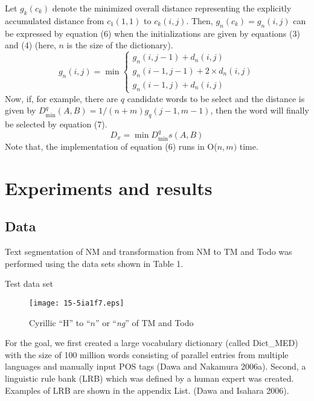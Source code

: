 \documentclass[english]{jnlp_1.4}
\begin{document}
Let $g_{k}(c_{k})$ denote the minimized overall distance representing the explicitly 
accumulated distance from $c_{1}(1,1)$ to $c_{k}(i,j)$. 
Then, $g_{n}(c_{k})=g_{n}(i,j)$ can be expressed by equation (6) when the initializations are given by 
equations (3) and (4) (here, $n$ is the size of the dictionary).
\begin{equation}
 g_{n}(i,j)= \min
  \begin{cases}
	g_{n}(i,j-1)+d_{n}(i,j) \\
	g_{n}(i-1,j-1)+2 \times d_{n}(i,j) \\
	g_{n}(i-1,j)+d_{n}(i,j)
  \end{cases}
\end{equation}
Now, if, for example, there are $q$ candidate words to be select and the distance is given 
by $D^{q}_{\min} (A,B)=1/(n+m)g_{q}(j-1, m-1)$, 
then the word will finally be selected by equation (7).
\begin{equation}
 D_{x}=\min{D^{q}_{\min}s(A,B)}
\end{equation}
Note that, the implementation of equation (6) runs in O($n,m)$ time.



\section{Experiments and results}


\subsection{Data}

Text segmentation of NM and transformation from NM to TM and Todo was 
performed using the data sets shown in Table 1.
\pagebreak

\begin{table}[b]
\caption{Test data set}
\begin{center}

\end{center}
\end{table}
\begin{figure}[b]
\centerline{\texttt{[image: 15-5ia1f7.eps]}}
\caption{Cyrillic ``H'' to ``$n$'' or ``\textit{ng}'' of TM and Todo}
\label{fig17}
\end{figure}


For the goal, we first created a large vocabulary dictionary (called 
Dict{\_}MED) with the size of 100 million words consisting of parallel 
entries from multiple languages and manually input POS tags (Dawa and 
Nakamura 2006a). Second, a linguistic rule bank (LRB) which was defined by a 
human expert was created. Examples of LRB are shown in the appendix List. 
(Dawa and Isahara 2006).
\end{document}

